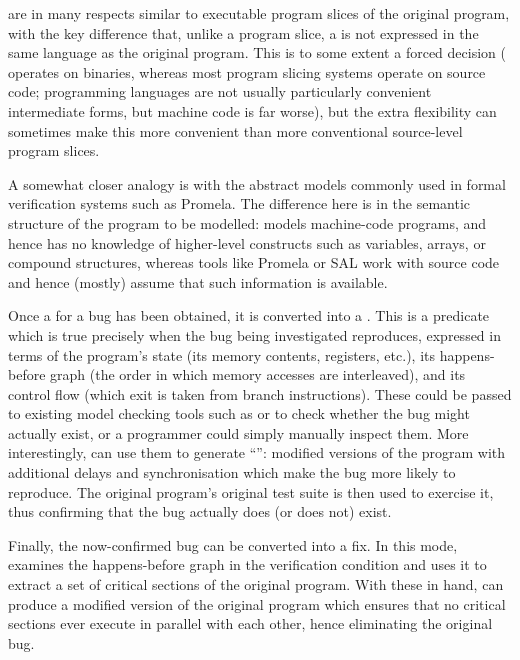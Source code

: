 \STateMachines are in many respects similar to executable program
slices of the original program, with the key difference that, unlike a
program slice, a \StateMachine is not expressed in the same language
as the original program.  This is to some extent a forced decision
({\technique} operates on binaries, whereas most program slicing
systems operate on source code; programming languages are not usually
particularly convenient intermediate forms, but machine code is far
worse), but the extra flexibility can sometimes make this more
convenient than more conventional source-level program
slices.

A somewhat closer analogy is with the abstract models commonly used in
formal verification systems such as Promela\needCite{}.  The
difference here is in the semantic structure of the program to be
modelled: \technique{} models machine-code programs, and hence has no
knowledge of higher-level constructs such as variables, arrays, or
compound structures, whereas tools like Promela or SAL\needCite{} work
with source code and hence (mostly) assume that such information is
available.

Once a {\StateMachine} for a bug has been obtained, it is converted
into a .  This is a predicate
which is true precisely when the bug being investigated reproduces,
expressed in terms of the program's state (its memory contents,
registers, etc.), its happens-before graph (the order in which memory
accesses are interleaved), and its control flow (which exit is taken
from branch instructions).  These could be passed to existing model
checking tools such as \needCite{} or \needCite{}  to check whether the
bug might actually exist, or a programmer could simply manually
inspect them.  More interestingly, {\technique} can use them to
generate ``'': modified versions of the program
with additional delays and synchronisation which make the bug more
likely to reproduce.  The original program's original test suite is
then used to exercise it, thus confirming that the bug actually does
(or does not) exist.

Finally, the now-confirmed bug can be converted into a fix.  In this
mode, {\technique} examines the happens-before graph in the
verification condition and uses it to extract a set of critical
sections of the original program.  With these in hand, {\technique}
can produce a modified version of the original program which ensures
that no critical sections ever execute in parallel with each other,
hence eliminating the original bug.

